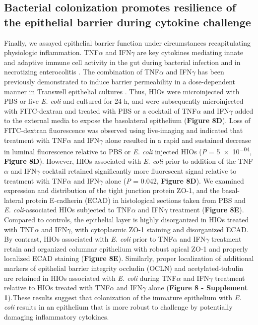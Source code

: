 \documentclass[9pt,lineo]{elife}
\begin{document}
\subsection*{{\bfseries\sffamily } Bacterial colonization promotes resilience of the epithelial barrier during cytokine challenge}
\label{sec:orgheadline11}
Finally, we assayed epithelial barrier function under circumstances recapitulating physiologic inflammation. TNF\(\alpha\) and IFN\(\gamma\) are key cytokines mediating innate and adaptive immune cell activity in the gut \citep{Turner:2009} during bacterial infection \citep{Rhee:2005,Emami:2012} and in necrotizing enterocolitis \citep{Tan:1993,Ford:1996,Ford:1997,Halpern:2003,Upperman:2005}. The combination of TNF\(\alpha\) and IFN\(\gamma\) has been previously demonstrated to induce barrier permeability in a dose-dependent manner in Transwell epithelial cultures \citep{Wang:2005,Wang:2006}. Thus, HIOs were microinjected with PBS or live \emph{E. coli} and cultured for 24 h, and were subsequently microinjected with FITC-dextran and treated with PBS or a cocktail of TNF\(\alpha\) and IFN\(\gamma\) added to the external media to expose the basolateral epithelium (\textbf{Figure 8D}). Loss of FITC-dextran fluorescence was observed using live-imaging and indicated that treatment with TNF\(\alpha\) and IFN\(\gamma\) alone resulted in a rapid and sustained decrease in luminal fluorescence relative to  PBS or \emph{E. coli} injected HIOs (\emph{P} = \num{5e-04}, \textbf{Figure 8D}). However, HIOs associated with \emph{E. coli} prior to addition of the TNF\(\alpha\) and IFN\(\gamma\) cocktail retained significantly more fluorescent signal relative to treatment with TNF\(\alpha\) and IFN\(\gamma\) alone (\emph{P} = 0.042, \textbf{Figure 8D}). We examined expression and distribution of the tight junction protein ZO-1, and the basal-lateral protein E-cadherin (ECAD)  in histological sections taken from PBS and \emph{E. coli}-associated HIOs subjected to TNF\(\alpha\) and IFN\(\gamma\) treatment (\textbf{Figure 8E}). Compared to controls, the epithelial layer is highly disorganized in HIOs treated with TNF\(\alpha\) and IFN\(\gamma\), with cytoplasmic ZO-1 staining and disorganized ECAD. By contrast, HIOs associated with \emph{E. coli} prior to TNF\(\alpha\) and IFN\(\gamma\) treatment retain and organized columnar epithelium with robust apical ZO-1 and properly localized ECAD staining (\textbf{Figure 8E}). Similarly, proper localization of additional markers of epithelial barrier integrity occludin (OCLN) and acetylated-tubulin are retained in HIOs associated with \emph{E. coli} during TNF\(\alpha\) and IFN\(\gamma\) treatment relative to HIOs treated with TNF\(\alpha\) and IFN\(\gamma\) alone (\textbf{Figure 8 - Supplement 1}).These results suggest that colonization of the immature epithelium with \emph{E. coli} results in an epithelium that is more robust to challenge by potentially damaging inflammatory cytokines.
\end{document}
